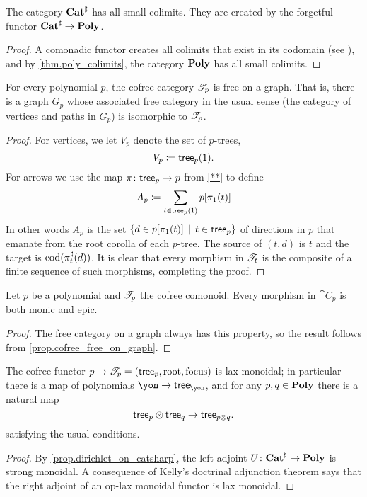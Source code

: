 \documentclass[Book-Poly]{subfiles}
\begin{document}
\begin{corollary}
The category $\mathbf{Cat}^\sharp$ has all small colimits.
They are created by the forgetful functor $\mathbf{Cat}^\sharp\to\mathbf{Poly}$.
\end{corollary}
\begin{proof}
A comonadic functor creates all colimits that exist in its codomain (see \cite{nlab:created-limit}), and by \cref{thm.poly_colimits}, the category $\mathbf{Poly}$ has all small colimits.
\end{proof}

\begin{proposition}\label{prop.cofree_free_on_graph}
For every polynomial $p$, the cofree category $\mathscr{T}_{p}$ is free on a graph. That is, there is a graph $G_p$ whose associated free category in the usual sense (the category of vertices and paths in $G_p$) is isomorphic to $\mathscr{T}_{p}$.
\end{proposition}
\begin{proof}
For vertices, we let $V_p$ denote the set of $p$-trees,
\[V_p\coloneqq\mathsf{tree}_p(\textsf{1}).\]
For arrows we use the map $\pi\colon\mathsf{tree}_p\to p$ from \cref{**} to define
\[
A_p\coloneqq\sum_{t\in\mathsf{tree}_p(\textsf{1})}p[\pi_1(t)]
\]
In other words $A_p$ is the set $\{d\in p[\pi_1(t)]\,\mid\,t\in\mathsf{tree}_p\}$ of directions in $p$ that emanate from the root corolla of each $p$-tree. The source of $(t,d)$ is $t$ and the target is $\operatorname{cod}(\pi^\sharp_t(d))$. It is clear that every morphism in $\mathscr{T}_{t}$ is the composite of a finite sequence of such morphisms, completing the proof.
\end{proof}


\begin{corollary}
Let $p$ be a polynomial and $\mathscr{T}_{p}$ the cofree comonoid. Every morphism in $\cat{C}_p$ is both monic and epic.
\end{corollary}
\begin{proof}
The free category on a graph always has this property, so the result follows from \cref{prop.cofree_free_on_graph}.
\end{proof}

\begin{proposition}\label{prop.cofree_lax_monoidal}
The cofree functor $p\mapsto\mathscr{T}_{p}=(\mathsf{tree}_p,\mathrm{root},\mathrm{focus})$ is lax monoidal; in particular there is a map of polynomials $\yon\to\tr_\yon$, and for any $p,q\in\mathbf{Poly}$ there is a natural map
\[
	\mathsf{tree}_p\otimes\mathsf{tree}_q\to\mathsf{tree}_{p\otimes q}.
\]
satisfying the usual conditions.
\end{proposition}
\begin{proof}
By \cref{prop.dirichlet_on_catsharp}, the left adjoint $U\colon\mathbf{Cat}^\sharp\to\mathbf{Poly}$ is strong monoidal. A consequence of Kelly's doctrinal adjunction theorem \cite{kelly1974doctrinal} says that the right adjoint of an op-lax monoidal functor is lax monoidal.
\end{proof}
\end{document}
